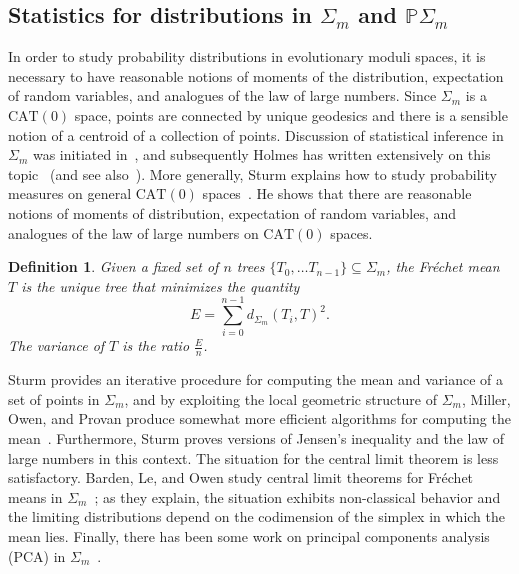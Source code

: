 \documentclass[a4paper,11pt]{article}
\newtheorem{definition}[theorem]{Definition}
\newcommand{\CAT}{\textrm{CAT}}
\begin{document}
\subsection{Statistics for distributions in $\Sigma_m$ and $\mathbb{P}\Sigma_m$}

In order to study probability distributions in evolutionary moduli spaces, it is necessary to have reasonable notions of moments of the distribution, expectation of random variables, and analogues of the law of large numbers.
Since $\Sigma_m$ is a $\CAT(0)$ space, points are connected by unique geodesics and there is a sensible notion of a centroid of a collection of points.
Discussion of statistical inference in $\Sigma_m$ was initiated in~\cite{billera2001geometry}, and subsequently Holmes has written extensively on this topic~\cite{holmes2003bootstrapping, holmes2003bootstrapping, holmes2005statistical} (and see also~\cite{feragen2013tree}).
More generally, Sturm explains how to study probability measures on general $\CAT(0)$ spaces~\cite{sturm2003probability}.
He shows that there are reasonable notions of moments of distribution, expectation of random variables, and analogues of the law of large numbers on $\CAT(0)$ spaces.

\begin{definition}
Given a fixed set of $n$ trees $\{T_0, \ldots T_{n-1}\} \subseteq \Sigma_m$, the Fr\'echet mean $T$ is the unique tree that minimizes the quantity \[E = \sum_{i = 0}^{n-1} d_{\Sigma_m}(T_i, T)^2.\] 
The variance of $T$ is the ratio $\frac{E}{n}$.
\end{definition}

Sturm provides an iterative procedure for computing the mean and variance of a set of points in $\Sigma_m$, and by exploiting the local geometric structure of $\Sigma_m$, Miller, Owen, and Provan produce somewhat more efficient algorithms for computing the mean~\cite{miller2012polyhedral}.
Furthermore, Sturm proves versions of Jensen's inequality and the law of large numbers in this context.
The situation for the central limit theorem is less satisfactory.
Barden, Le, and Owen study central limit theorems for Fr\'echet means in $\Sigma_m$~\cite{barden2013mean}; as they explain, the situation exhibits non-classical behavior and the limiting distributions depend on the codimension of the simplex in which the mean lies.
Finally, there has been some work on principal components analysis (PCA) in $\Sigma_m$~\cite{Nye2011PCA}.
\end{document}
